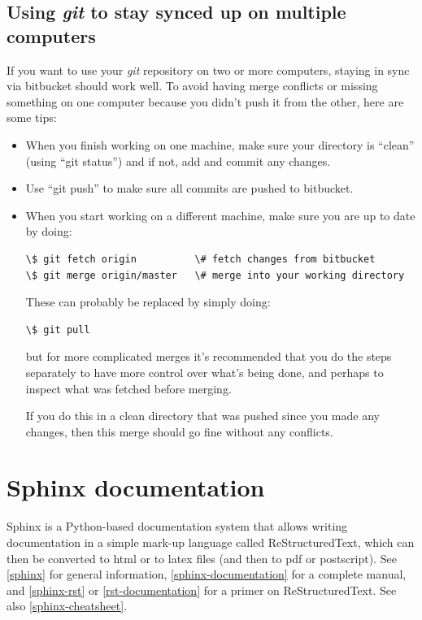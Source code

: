\documentclass[letterpaper,10pt,english]{sphinxmanual}
\begin{document}
\subsection{Using \emph{git} to stay synced up on multiple computers}
\label{git_more:using-git-to-stay-synced-up-on-multiple-computers}
If you want to use your \emph{git} repository on two or more computers, staying
in sync via bitbucket should work well. To avoid having merge conflicts or
missing something on one computer because you didn't push it from the other,
here are some tips:
\begin{itemize}
\item {} 
When you finish working on one machine, make sure your directory is
``clean'' (using ``git status'') and if not, add and commit any changes.

\item {} 
Use ``git push'' to make sure all commits are pushed to bitbucket.

\item {} 
When you start working on a different machine, make sure you are up to
date by doing:

\begin{Verbatim}[commandchars=\\\{\}]
\$ git fetch origin          \# fetch changes from bitbucket
\$ git merge origin/master   \# merge into your working directory
\end{Verbatim}

These can probably be replaced by simply doing:

\begin{Verbatim}[commandchars=\\\{\}]
\$ git pull
\end{Verbatim}

but for more complicated merges it's recommended that you do the steps
separately to have more control over what's being done, and perhaps to
inspect what was fetched before merging.

If you do this in a clean directory that was pushed since you made any
changes, then this merge should go fine without any conflicts.

\end{itemize}


\section{Sphinx documentation}
\label{sphinx:sphinx}\label{sphinx:sphinx-documentation}\label{sphinx::doc}
Sphinx is a Python-based documentation system that allows writing
documentation in a simple mark-up language called ReStructuredText, which
can then be converted to html or to latex files (and then to pdf or
postscript).  See {\hyperref[biblio:sphinx]{{[}sphinx{]}}} for general information,
{\hyperref[biblio:sphinx-documentation]{{[}sphinx-documentation{]}}} for a
complete manual, and {\hyperref[biblio:sphinx-rst]{{[}sphinx-rst{]}}} or {\hyperref[biblio:rst-documentation]{{[}rst-documentation{]}}}
for a primer on ReStructuredText.
See also {\hyperref[biblio:sphinx-cheatsheet]{{[}sphinx-cheatsheet{]}}}.
\end{document}
